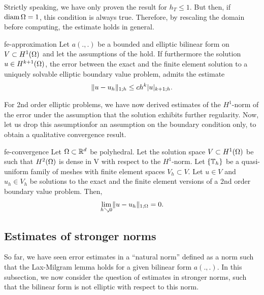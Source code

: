 \begin{remark}
  Strictly speaking, we have only proven the result for $h_T \le
  1$.
  But then, if $\operatorname{diam}\Omega = 1$, this condition is always
  true. Therefore, by rescaling the domain before computing, the
  estimate holds in general.
\end{remark}

\begin{Corollary}{fe-approximation}
  Let $a(.,.)$ be a bounded and elliptic bilinear form on
  $V\subset H^1(\Omega)$ and let the
  assumptions of the  hold. If
  furthermore the solution $u\in H^{k+1}(\Omega)$, the error between
  the exact and the finite element solution to a uniquely solvable
  elliptic boundary value problem, admits the estimate
  \begin{gather}
    \lVert u-u_h\rVert_{1;h} \le c h^{k} \lvert u\rvert_{k+1;h}.
  \end{gather}  
\end{Corollary}

\begin{intro}
  For 2nd order elliptic problems, we have now derived estimates of
  the $H^1$-norm of the error under the assumption that the solution
  exhibits further regularity. Now, let us drop this assumptionfor an
  assumption on the boundary condition only, to obtain a qualitative
  convergence result.
\end{intro}

\begin{Theorem}{fe-convergence}
  Let $\Omega\subset \mathbb R^d$ be polyhedral. Let the solution space
  $V\subset H^1(\Omega)$ be such that $H^2(\Omega)$ is dense in V
  with respect to the $H^1$-norm. Let $\{\mathbb T_h\}$ be a quasi-uniform
  family of meshes with finite element spaces $V_h\subset V$. Let
  $u\in V$ and $u_h\in V_h$ be solutions to the exact and the finite
  element versions of a 2nd order boundary value problem. Then,
  \begin{gather}
    \lim_{h\searrow 0} \lVert u-u_h\rVert_{1;\Omega} = 0.
  \end{gather}
\end{Theorem}

\subsection{Estimates of stronger norms}

\begin{intro}
  So far, we have seen error estimates in a ``natural norm'' defined
  as a norm such that the Lax-Milgram lemma holds for a given bilinear
  form $a(.,.)$. In this subsection, we now consider the question of
  estimates in stronger norms, such that the bilinear form is not
  elliptic with respect to this norm.
\end{intro}

